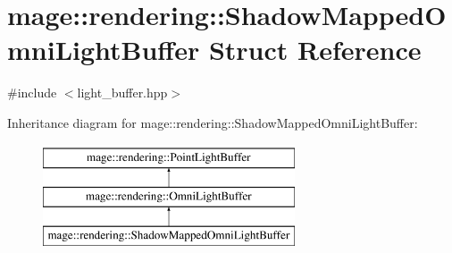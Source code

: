 \hypertarget{structmage_1_1rendering_1_1_shadow_mapped_omni_light_buffer}{}\section{mage\+:\+:rendering\+:\+:Shadow\+Mapped\+Omni\+Light\+Buffer Struct Reference}
\label{structmage_1_1rendering_1_1_shadow_mapped_omni_light_buffer}


{\ttfamily \#include $<$light\+\_\+buffer.\+hpp$>$}

Inheritance diagram for mage\+:\+:rendering\+:\+:Shadow\+Mapped\+Omni\+Light\+Buffer\+:\begin{figure}[H]
\begin{center}
\leavevmode
\includegraphics[height=3.000000cm]{structmage_1_1rendering_1_1_shadow_mapped_omni_light_buffer}
\end{center}
\end{figure}
